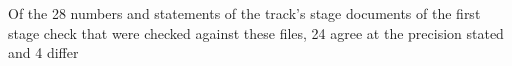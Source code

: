 Of the 28 numbers and statements of the track's stage documents of the first stage check that were checked against these files, 24 agree at the precision stated and 4 differ%
